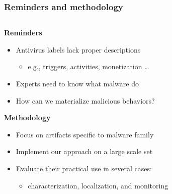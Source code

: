 \begin{frame}
    \frametitle{Reminders and methodology}

    \begin{columns}
        \begin{column}{0.8\textwidth}
            \begin{block}{}
                \centering
                \textbf{Reminders}
            \end{block}
            \begin{itemize}
                \item Antivirus labels lack proper descriptions
                \begin{itemize}
                    \item e.g., triggers, activities, monetization \ldots
                \end{itemize}
                \item Experts need to know what malware do
                \item How can we materialize malicious behaviors?
            \end{itemize}

            \begin{block}{}
                \centering
                \textbf{Methodology}
            \end{block}
            \begin{itemize}
                \item Focus on artifacts specific to malware family
                \item Implement our approach on a large scale set
                \item Evaluate their practical use in several cases:
                \begin{itemize}
                    \item characterization, localization, and monitoring
                \end{itemize}
            \end{itemize}
        \end{column}


\end{columns}
\end{frame}
